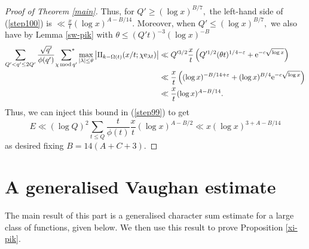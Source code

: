 \documentclass{article}
\newcommand{\Mod}{\,\mathrm{mod}\,}
\newcommand{\e}{\mathrm{e}}
\newcommand{\eps}{\varepsilon}
\newcommand{\starsum}{\ \sideset{}{^*}\sum}
\begin{document}
\begin{proof}[Proof of Theorem \ref{main}]
    Thus, for $Q' \ge (\log x)^{B/7},$ the left-hand side of (\ref{step100}) is $\ll \frac{x}{t}(\log x)^{A-B/14}.$ 
    Moreover, when $Q'\le (\log x)^{B/7},$ we also have by Lemma \ref{sw-pik} with $\theta \le (Q't)^{-3}(\log x)^{-B}$
    \begin{align*}
        \sum_{Q' < q'\le 2Q'} \frac{\sqrt{q'}}{\phi(q')} \starsum_{\chi\Mod q'} \max_{|\lambda|\le \theta} \left|\Pi_{k-\Omega(t)}(x/t; \chi\e_{\lambda t})\right| &\ll Q'^{3/2} \frac{x}{t}\left(Q'^{1/2}(\theta t)^{1/4-\eps} + \e^{-c\sqrt{\log x}}\right)
        \\&\ll  \frac{x}{t}\left((\log x)^{-B/14 + \eps} + (\log x)^{B/4}\e^{-c\sqrt{\log x}}\right)
        \\&\ll \frac{x}{t}(\log x)^{A-B/14}.
    \end{align*}
    Thus, we can inject this bound in (\ref{step99}) to get 
    $$E \ll (\log Q)^2 \sum_{t\le Q} \frac{t}{\phi(t)} \frac{x}{t} (\log x)^{A-B/2} \ll x(\log x)^{3+A-B/14}$$ as desired fixing $B = 14(A+C+3).$
\end{proof}


\section{A generalised Vaughan estimate}\label{bv1}

The main result of this part is a generalised character sum estimate for a large class of functions, given below. We then use this result to prove Proposition \ref{xi-pik}.
\end{document}
